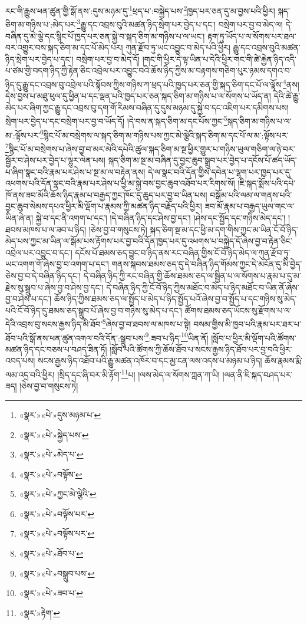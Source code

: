 རང་གི་རྒྱུས་ཕན་ཚུན་གྱི་སྒོ་ནས་:དུས་མཉམ་དུ་\footnote{«སྣར་»«པེ་»དུས་མཉམ་པ་}ཕྲད་པ་:བསྐྱེད་པས་\footnote{«སྣར་»«པེ་»སྐྱེད་པས་}ཁྱད་པར་ཅན་དུ་མ་བྱས་པའི་ཕྱིར། སྐད་ཅིག་མ་གཉིས་པ་:མེད་པར་\footnote{«སྣར་»«པེ་»མེད་པ་}རྒྱུ་དང་འབྲས་བུའི་མཚན་ཉིད་སྲེག་པར་བྱེད་པ་དང་། བསྲེག་པར་བྱ་བ་མེད་ལ། དེ་བཞིན་དུ་མེ་ལྕེ་དང་སྙིང་པོ་ཁྱད་པར་ཅན་སྐྱེ་བ་སྐད་ཅིག་མ་གཉིས་པ་ལ་ཡང་། རྟག་ཏུ་ཡོད་པ་ལ་སོགས་པར་ཐལ་བར་འགྱུར་བས་སྐད་ཅིག་མ་དང་པོ་མེད་པར། ཀུན་རྫོབ་ཏུ་ཡང་འབྱུང་བ་མེད་པའི་ཕྱིར། རྒྱུ་དང་འབྲས་བུའི་མཚན་ཉིད་སྲེག་པར་བྱེད་པ་དང་། བསྲེག་པར་བྱ་བ་མེད་དོ། །གང་གི་ཕྱིར་དེ་ལྟ་ཡིན་པ་དེའི་ཕྱིར་གང་གི་ཚེ་རྐྱེན་ཉིད་འདི་པ་ཙམ་གྱི་བདག་ཉིད་ཀྱི་རྟེན་ཅིང་འབྲེལ་པར་འབྱུང་བའི་ཆོས་ཉིད་ཀྱིས་མ་བརྟགས་གཅིག་པུར་ཉམས་དགའ་བ་ཉིད་དུ་རྒྱུ་དང་འབྲས་བུ་འབྲེལ་པའི་སྟོབས་ཀྱིས་གཉིས་ཀ་ཕྲད་པའི་ཁྱད་པར་ཅན་གྱི་སྐད་ཅིག་དང་པོ་ལ་ལྟོས་\footnote{«སྣར་»«པེ་»བལྟོས་}ནས། དེས་བྱས་པ་མཐུ་ཕུལ་དུ་ཕྱིན་པ་དང་ལྡན་པའི་ཁྱད་པར་ཅན་སྐད་ཅིག་མ་གཉིས་པ་ལ་སོགས་པ་ཡོད་ན། དེའི་ཚེ་རྒྱུ་མེད་པར་ཞིག་ཀྱང་རྒྱུ་དང་འབྲས་བུ་དག་གོ་རིམས་བཞིན་དུ་དུས་མཉམ་དུ་སྐྱེ་བ་དང་འཇིག་པར་དམིགས་པས། སྲེག་པར་བྱེད་པ་དང་བསྲེག་པར་བྱ་བ་ཡོད་དོ། །དེ་བས་ན་སྐད་ཅིག་མ་དང་པོས་ཀྱང་\footnote{«སྣར་»«པེ་»ཀྱང་མེ་ལྕེའི་}སྐད་ཅིག་མ་གཉིས་པ་ལ་མ་:ལྟོས་པར་\footnote{«སྣར་»«པེ་»བལྟོས་པར་}སྙིང་པོ་མ་བསྲེགས་ལ་སྐད་ཅིག་མ་གཉིས་པས་ཀྱང་མེ་ལྕེའི་སྐད་ཅིག་མ་དང་པོ་ལ་མ་:ལྟོས་པར་\footnote{«སྣར་»«པེ་»བལྟོས་པར་}སྙིང་པོ་མ་བསྲེགས་པ་ཞེས་བྱ་བ་མར་མེའི་དཔེའི་ཚུལ་སྐད་ཅིག་མ་སྔ་ཕྱིར་གྱུར་པ་གཉིས་ཡུལ་གཅིག་ལ་ཉེ་བར་སྦྱོར་བ་ཤེས་པར་བྱེད་པ་ལྷུར་ལེན་པས། སྐད་ཅིག་མ་སྔ་མ་བཞིན་དུ་བྱང་ཆུབ་སྒྲུབ་པར་བྱེད་པ་དངོས་པོ་ཚད་ཡོད་པ་ཞིག་སྣང་བའི་རྣམ་པར་ཤེས་པ་སྔ་མ་ལ་བརྟེན་ནས། དེ་ལ་སྣང་བའི་དོན་གྱིས་དབེན་པ་ལྷག་པར་ཁྱད་པར་དུ་འཕགས་པའི་དོན་སྣང་བའི་རྣམ་པར་ཤེས་པ་ཕྱི་མ་སྐྱེ་བས་བྱང་ཆུབ་འཐོབ་པར་རིགས་སོ། །ཇི་སྐད་སྨོས་པའི་དཔེ་ཁོ་ནས་ཟབ་མོའི་ཆོས་ཉིད་རྣམ་པ་བརྒྱད་ཀྱང་ཁོང་དུ་ཆུད་པར་བྱ་བ་ཡིན་པས། བསྒོམ་པའི་ལམ་ལ་གནས་པའི་བྱང་ཆུབ་སེམས་དཔའ་ཕྱིར་མི་ལྡོག་པ་རྣམས་ཀྱི་མཚན་ཉིད་བརྗོད་པའི་ཕྱིར། ཟབ་མོ་རྣམ་པ་བརྒྱད་ཡུལ་གང་ལ་ཡིན་ཞེ་ན། སྐྱེ་བ་དང་ནི་འགག་པ་དང་། །དེ་བཞིན་ཉིད་དང་ཤེས་བྱ་དང་། །ཤེས་དང་སྤྱོད་དང་གཉིས་མེད་དང་། །ཐབས་མཁས་པ་ལ་ཟབ་པ་ཉིད། །ཅེས་བྱ་བ་གསུངས་ཏེ། སྐད་ཅིག་སྔ་མ་དང་ཕྱི་མ་དག་གིས་ཀྱང་མ་ཡིན་ངོ་བོ་ཉིད་མེད་པས་ཀྱང་མ་ཡིན་ལ་སྒོམ་པས་རྟོགས་པར་བྱ་བའི་དོན་ཁྱད་པར་དུ་འཕགས་པ་བསྐྱེད་དོ་ཞེས་བྱ་བ་རྟེན་ཅིང་འབྲེལ་པར་འབྱུང་བ་དང་། དངོས་པོ་ཐམས་ཅད་བྱུང་བ་ཉིད་ནས་རང་བཞིན་གྱིས་ངོ་བོ་ཉིད་མེད་ལ་ཀུན་རྫོབ་ཏུ་ཡང་འགག་གོ་ཞེས་བྱ་བ་འགག་པ་དང་། གནས་སྐབས་ཐམས་ཅད་དུ་དེ་བཞིན་ཉིད་གོམས་ཀྱང་དེ་མངོན་དུ་མི་བྱེད་ཅེས་བྱ་བ་དེ་བཞིན་ཉིད་དང་། དེ་བཞིན་ཉིད་ཀྱི་རང་བཞིན་གྱི་ཆོས་ཐམས་ཅད་ལ་སྦྱིན་པ་ལ་སོགས་པ་རྣམ་པ་དུ་མ་རྗེས་སུ་སྒྲུབ་པ་ཞེས་བྱ་བ་ཤེས་བྱ་དང་། དེ་བཞིན་ཉིད་ཀྱི་ངོ་བོ་ཉིད་ཀྱིས་མཐོང་བ་མེད་པ་ཉིད་མཐོང་བ་ཡིན་ནོ་ཞེས་བྱ་བ་ཤེས་པ་དང་། ཆོས་ཉིད་ཀྱིས་ཐམས་ཅད་ལ་སྤྱོད་པ་མེད་པ་ཉིད་སྤྱོད་པའོ་ཞེས་བྱ་བ་སྤྱོད་པ་དང་གཉིས་སུ་མེད་པའི་ངོ་བོ་ཉིད་དུ་ཐམས་ཅད་སྒྲུབ་པོ་ཞེས་བྱ་བ་གཉིས་སུ་མེད་པ་དང་། ཚོགས་ཐམས་ཅད་ཡོངས་སུ་རྫོགས་པ་ལ་དེའི་འབྲས་བུ་སངས་རྒྱས་ཉིད་མི་ཐོབ་\footnote{«སྣར་»«པེ་»ཐོབ་པ་}ཞེས་བྱ་བ་ཐབས་ལ་མཁས་པ་སྟེ། བསམ་གྱིས་མི་ཁྱབ་པའི་རྣམ་པར་ཐར་པ་ཐོབ་པའི་སྒོ་ནས་ཕན་ཚུན་འགལ་བའི་དོན་:སྒྲུབ་པས་\footnote{«སྣར་»«པེ་»བསྒྲུབ་པས་}:ཟབ་པ་ཉིད་\footnote{«སྣར་»«པེ་»ཟབ་པ་}ཡིན་ནོ། །སློབ་པ་ཕྱིར་མི་ལྡོག་པའི་ཚོགས་མཚན་ཉིད་དང་བཅས་པ་བཤད་ཟིན་ཏོ། །སློབ་པའི་ཚོགས་ཀྱི་ཆོས་ཐོབ་པ་སངས་རྒྱས་ཉིད་ཐོབ་པར་བྱ་བའི་ཕྱིར་འབད་པས། སངས་རྒྱས་ཉིད་འཐོབ་པའི་རྒྱུ་མཚན་འཁོར་བ་དང་མྱ་ངན་ལས་འདས་པ་མཉམ་པ་ཉིད། ཆོས་རྣམས་རྨི་ལམ་འདྲ་བའི་ཕྱིར། །སྲིད་དང་ཞི་བར་མི་རྟོག་\footnote{«སྣར་»རྟེག་}པ། །ལས་མེད་ལ་སོགས་ཀླན་ཀ་ཡི། །ལན་ནི་ཇི་སྐད་བཤད་པར་ཟད། །ཅེས་བྱ་བ་གསུངས་ཏེ། 